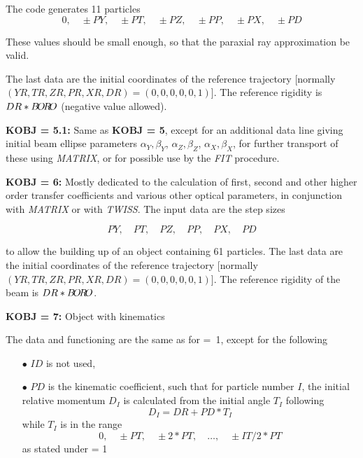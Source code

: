 \noindent The code generates  11 particles 
$$ 0,\quad \pm PY,\quad \pm PT,\quad \pm PZ,\quad \pm PP, \quad \pm PX, \quad \pm PD $$

\noindent These values should be small enough, so that the paraxial ray
approximation be valid. 

\noindent The last data are the initial coordinates of the reference 
trajectory [normally $(YR, TR, ZR, PR, XR, DR) = (0, 0, 0, 0, 0, 1)$]. 
The reference rigidity  is $ DR\ast B\!O\!R\!O$ 
(negative value allowed).  

\bigskip

\noindent\textbf{KOBJ = 5.1:} Same as \textbf{KOBJ = 5}, except for an additional data line giving 
initial beam ellipse parameters $\alpha_Y, \beta_Y$, $\alpha_Z, \beta_Z$, $\alpha_X, \beta_X$,  
 for further transport of these using \textsl{MATRIX}, or for  possible use by the \textsl{FIT} procedure. 

\bigskip


\noindent\textbf{KOBJ = 6:}  Mostly dedicated to the calculation of first, second
and other higher order transfer coefficients and various other  optical parameters, 
in conjunction with \textsl{MATRIX} or with \textsl{TWISS}. 
The input data are the step sizes 

$$ PY,\quad PT,\quad PZ,\quad PP, \quad PX, \quad PD $$
 
 \noindent to allow the building up of an object containing 61 particles.  The
last data are the initial coordinates of the reference 
trajectory [normally $(YR, TR, ZR, PR, XR, DR) = (0, 0, 0, 0, 0, 1)$]. 
The reference rigidity of the beam  is $ DR\ast B\!O\!R\!O$.  

\bigskip


\noindent\textbf{KOBJ = 7:} Object with kinematics 

\noindent The data and functioning are the same as for \mbox{\KOBJ= 1}, except for the 
following  
\begin{itemize}
\item[$\bullet$]  $ ID $ is not used,  
\item[$\bullet$]  $ PD $ is the kinematic coefficient, such that for particle
number $ I$,  the initial relative momentum $ D_I $ is calculated from the initial angle 
$T_I $ following
$$ D_I = DR+ PD \ast  T_I $$
 while $ T_I $ is in the range
$$ 0,\quad \pm PT,\quad \pm 2\ast PT,\quad \ldots,\quad \pm IT/2\ast PT $$
 as stated under \KOBJ = 1
\end{itemize}


